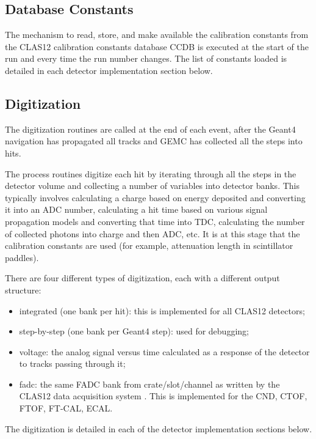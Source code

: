 \subsection{Database Constants}

The mechanism to read, store, and make available the calibration constants from the CLAS12
calibration constants database CCDB \cite{ccdb} is
executed at the start of the run and every time the run number changes.
The list of constants loaded is detailed in each detector implementation section below.

\subsection{Digitization}

The digitization routines are called at the end of each event, after the Geant4 navigation
has propagated all tracks and GEMC has collected all the steps into hits.

The process routines digitize each hit by iterating through all the steps in the detector volume and collecting
a number of variables into detector banks. This typically involves calculating a charge based
on energy deposited and converting it into an ADC number, calculating a hit time based
on various signal propagation models and converting that time into TDC, calculating the number
of collected photons into charge and then ADC, etc. It is at this stage that the calibration
constants are used (for example, attenuation length in scintillator paddles).

There are four different types of digitization, each with a different output structure:

\begin{itemize}
	\item integrated (one bank per hit): this is implemented for all CLAS12 detectors;
	\item step-by-step (one bank per Geant4 step): used for debugging;
	\item voltage: the analog signal versus time calculated as a response of the detector to tracks passing through it;
	\item fadc: the same FADC bank from crate/slot/channel as written by the CLAS12 data acquisition system \cite{daq-nim}.
          This is implemented for the CND, CTOF, FTOF, FT-CAL, ECAL.
\end{itemize}


The digitization is detailed in each of the detector implementation sections below.


